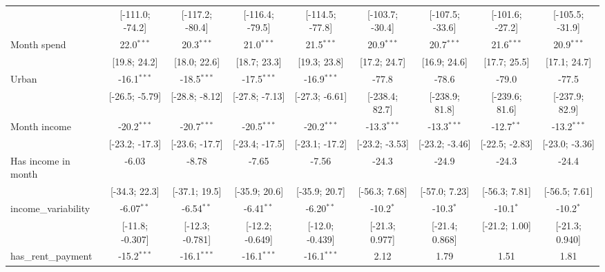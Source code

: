 \begin{table}[htbp]
\begin{threeparttable}[b]
\begin{tabular}{lcccccccc}
                                   & [-111.0; -74.2] & [-117.2; -80.4] & [-116.4; -79.5] & [-114.5; -77.8] & [-103.7; -30.4] & [-107.5; -33.6] & [-101.6; -27.2] & [-105.5; -31.9]\\   
         Month spend               & 22.0$^{***}$    & 20.3$^{***}$    & 21.0$^{***}$    & 21.5$^{***}$    & 20.9$^{***}$    & 20.7$^{***}$    & 21.6$^{***}$    & 20.9$^{***}$\\   
                                   & [19.8; 24.2]    & [18.0; 22.6]    & [18.7; 23.3]    & [19.3; 23.8]    & [17.2; 24.7]    & [16.9; 24.6]    & [17.7; 25.5]    & [17.1; 24.7]\\   
         Urban                     & -16.1$^{***}$   & -18.5$^{***}$   & -17.5$^{***}$   & -16.9$^{***}$   & -77.8           & -78.6           & -79.0           & -77.5\\   
                                   & [-26.5; -5.79]  & [-28.8; -8.12]  & [-27.8; -7.13]  & [-27.3; -6.61]  & [-238.4; 82.7]  & [-238.9; 81.8]  & [-239.6; 81.6]  & [-237.9; 82.9]\\   
         Month income              & -20.2$^{***}$   & -20.7$^{***}$   & -20.5$^{***}$   & -20.2$^{***}$   & -13.3$^{***}$   & -13.3$^{***}$   & -12.7$^{**}$    & -13.2$^{***}$\\   
                                   & [-23.2; -17.3]  & [-23.6; -17.7]  & [-23.4; -17.5]  & [-23.1; -17.2]  & [-23.2; -3.53]  & [-23.2; -3.46]  & [-22.5; -2.83]  & [-23.0; -3.36]\\   
         Has income in month       & -6.03           & -8.78           & -7.65           & -7.56           & -24.3           & -24.9           & -24.3           & -24.4\\   
                                   & [-34.3; 22.3]   & [-37.1; 19.5]   & [-35.9; 20.6]   & [-35.9; 20.7]   & [-56.3; 7.68]   & [-57.0; 7.23]   & [-56.3; 7.81]   & [-56.5; 7.61]\\   
         income\_variability       & -6.07$^{**}$    & -6.54$^{**}$    & -6.41$^{**}$    & -6.20$^{**}$    & -10.2$^{*}$     & -10.3$^{*}$     & -10.1$^{*}$     & -10.2$^{*}$\\   
                                   & [-11.8; -0.307] & [-12.3; -0.781] & [-12.2; -0.649] & [-12.0; -0.439] & [-21.3; 0.977]  & [-21.4; 0.868]  & [-21.2; 1.00]   & [-21.3; 0.940]\\   
         has\_rent\_payment        & -15.2$^{***}$   & -16.1$^{***}$   & -16.1$^{***}$   & -16.1$^{***}$   & 2.12            & 1.79            & 1.51            & 1.81\\   

\end{tabular}
\end{threeparttable}
\end{table}
